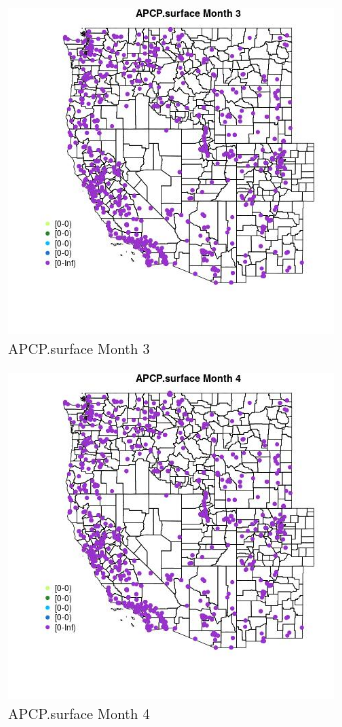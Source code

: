 \begin{figure} 
\centering  
\includegraphics[width=0.77\textwidth]{Code_Outputs/Report_ML_input_PM25_Step4_part_f_de_duplicated_aves_prioritize_24hr_obswNAs_MapObsMo3APCPsurface.jpg} 
\caption{\label{fig:Report_ML_input_PM25_Step4_part_f_de_duplicated_aves_prioritize_24hr_obswNAsMapObsMo3APCPsurface}APCP.surface Month 3} 
\end{figure} 
 

\begin{figure} 
\centering  
\includegraphics[width=0.77\textwidth]{Code_Outputs/Report_ML_input_PM25_Step4_part_f_de_duplicated_aves_prioritize_24hr_obswNAs_MapObsMo4APCPsurface.jpg} 
\caption{\label{fig:Report_ML_input_PM25_Step4_part_f_de_duplicated_aves_prioritize_24hr_obswNAsMapObsMo4APCPsurface}APCP.surface Month 4} 
\end{figure} 
 

